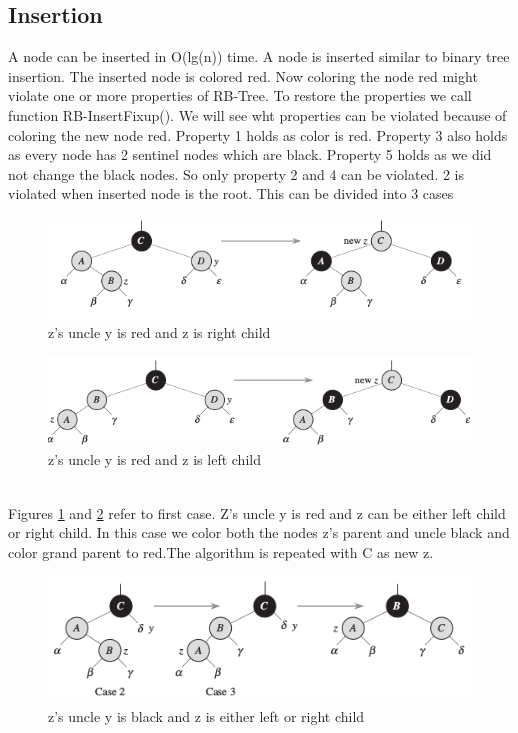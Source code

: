 \documentclass[BTech]{iitmdiss}
\begin{document}
\subsection{Insertion}
A node can be inserted in O(lg(n)) time. A node is inserted similar to binary tree insertion. The inserted node is colored red. Now coloring the node red might violate one or more properties of RB-Tree. To restore the properties we call function RB-InsertFixup(). We will see wht properties can be violated because of coloring the new node red. Property 1 holds as color is red. Property 3 also holds as every node has 2 sentinel nodes which are black. Property 5 holds as we did not change the black nodes. So only property 2 and 4 can be violated. 2 is violated when inserted node is the root. This can be divided into 3 cases\\
\begin{figure}[h]
    \centering
    \centerline{\includegraphics{cse1.png}}
    \caption{z's uncle y  is red and z is right child}
    \label{fig:case1.1}
\end{figure}
\begin{figure}[h]
    \centering
    \centerline{\includegraphics{case1.png}}
    \caption{z's uncle y is red and z is left child}
    \label{fig:case1.2}
\end{figure}\\
Figures \ref{fig:case1.1} and \ref{fig:case1.2} refer to first case. Z's uncle y is red and z can be either left child or right child. In this case we color both the nodes z's parent and uncle black and color grand parent to red.The algorithm is repeated with C as new z.\\
\begin{figure}[h]
    \centering
    \centerline{\includegraphics{case2,3.png}}
    \caption{z's uncle y is black and z is either left or right child}
    \label{fig:case2,3}
\end{figure}\\
\end{document}
